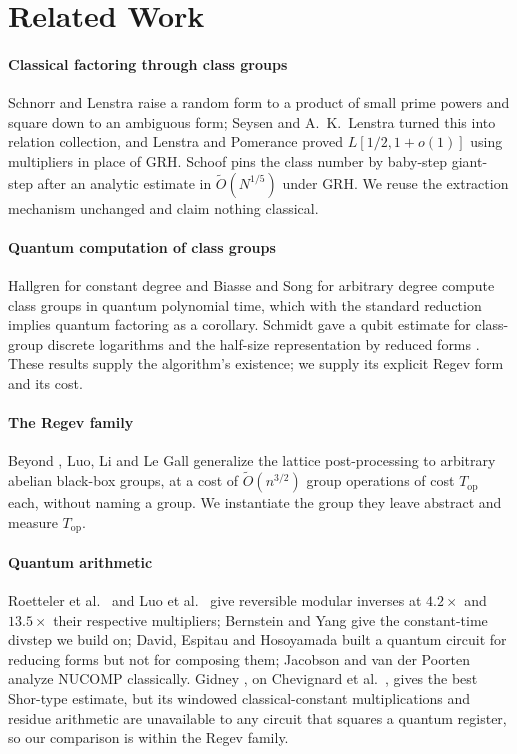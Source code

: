 \documentclass[runningheads]{llncs}
\begin{document}
\section{Related Work}
\paragraph{Classical factoring through class groups} Schnorr and Lenstra \cite{schnorr1984} raise a random form to a product of small prime powers and square down to an ambiguous form; Seysen and A.~K.~Lenstra turned this into relation collection, and Lenstra and Pomerance \cite{lenstra1992} proved $L[1/2,1+o(1)]$ using multipliers in place of GRH. Schoof \cite{schoof1982} pins the class number by baby-step giant-step after an analytic estimate in $\tilde O(N^{1/5})$ under GRH. We reuse the extraction mechanism unchanged and claim nothing classical.

\paragraph{Quantum computation of class groups} Hallgren \cite{hallgren2005} for constant degree and Biasse and Song \cite{biasse2016} for arbitrary degree compute class groups in quantum polynomial time, which with the standard reduction \cite{cohen1993} implies quantum factoring as a corollary. Schmidt gave a qubit estimate for class-group discrete logarithms \cite{schmidt2006} and the half-size representation by reduced forms \cite{schmidt2009}. These results supply the algorithm's existence; we supply its explicit Regev form and its cost.

\paragraph{The Regev family} Beyond \cite{regev2023,ragavan2024,ekera2024,pilatte2024}, Luo, Li and Le Gall \cite{luo2026} generalize the lattice post-processing to arbitrary abelian black-box groups, at a cost of $\tilde O(n^{3/2})$ group operations of cost $T_{\mathrm{op}}$ each, without naming a group. We instantiate the group they leave abstract and measure $T_{\mathrm{op}}$.

\paragraph{Quantum arithmetic} Roetteler et al.~\cite{roetteler2017} and Luo et al.~\cite{luo2026b} give reversible modular inverses at $4.2\times$ and $13.5\times$ their respective multipliers; Bernstein and Yang \cite{bernstein2019} give the constant-time divstep we build on; David, Espitau and Hosoyamada \cite{david2022} built a quantum circuit for reducing forms but not for composing them; Jacobson and van der Poorten \cite{jacobson2002} analyze NUCOMP classically. Gidney \cite{gidney2025}, on Chevignard et al.~\cite{chevignard2024}, gives the best Shor-type estimate, but its windowed classical-constant multiplications and residue arithmetic are unavailable to any circuit that squares a quantum register, so our comparison is within the Regev family.
\end{document}
